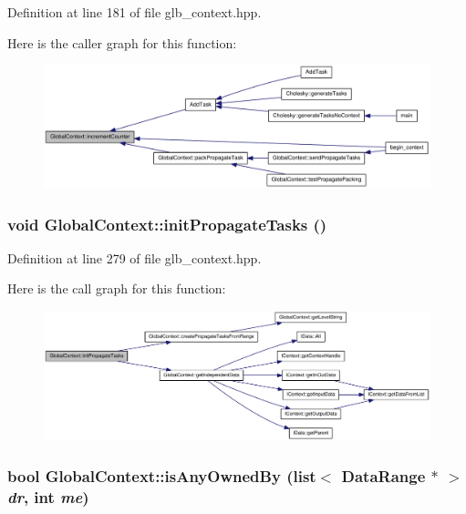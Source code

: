 Definition at line 181 of file glb\_\-context.hpp.

Here is the caller graph for this function:\nopagebreak
\begin{figure}[H]
\begin{center}
\leavevmode
\includegraphics[width=373pt]{class_global_context_a9348325efe41d1edae48c4313d07dc1a_icgraph}
\end{center}
\end{figure}
\hypertarget{class_global_context_ac3f59832451f3d6b377a33ad01ea5cf5}{
\subsubsection[{initPropagateTasks}]{\setlength{\rightskip}{0pt plus 5cm}void GlobalContext::initPropagateTasks ()}}
\label{class_global_context_ac3f59832451f3d6b377a33ad01ea5cf5}


Definition at line 279 of file glb\_\-context.hpp.

Here is the call graph for this function:\nopagebreak
\begin{figure}[H]
\begin{center}
\leavevmode
\includegraphics[width=419pt]{class_global_context_ac3f59832451f3d6b377a33ad01ea5cf5_cgraph}
\end{center}
\end{figure}
\hypertarget{class_global_context_a33b1aec3eb90bf8bfca3307d47058606}{
\subsubsection[{isAnyOwnedBy}]{\setlength{\rightskip}{0pt plus 5cm}bool GlobalContext::isAnyOwnedBy (list$<$ {\bf DataRange} $\ast$ $>$ {\em dr}, \/  int {\em me})}}
\label{class_global_context_a33b1aec3eb90bf8bfca3307d47058606}


